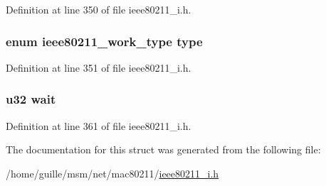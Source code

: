 Definition at line 350 of file ieee80211\-\_\-i.\-h.

\hypertarget{structieee80211__work_abf1dbe34cf79d583ad1c34c2fe8bbaec}{
\subsubsection[{type}]{\setlength{\rightskip}{0pt plus 5cm}enum {\bf ieee80211\-\_\-work\-\_\-type} type}}\label{structieee80211__work_abf1dbe34cf79d583ad1c34c2fe8bbaec}


Definition at line 351 of file ieee80211\-\_\-i.\-h.

\hypertarget{structieee80211__work_ad656a22cd7138c32438d6fff315a9611}{
\subsubsection[{wait}]{\setlength{\rightskip}{0pt plus 5cm}u32 wait}}\label{structieee80211__work_ad656a22cd7138c32438d6fff315a9611}


Definition at line 361 of file ieee80211\-\_\-i.\-h.



The documentation for this struct was generated from the following file\-:\begin{DoxyCompactItemize}
\item 
/home/guille/msm/net/mac80211/\hyperlink{ieee80211__i_8h}{ieee80211\-\_\-i.\-h}\end{DoxyCompactItemize}
